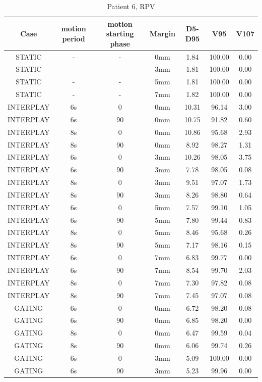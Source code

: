 \documentclass[type=dr, dr=rernat, accentcolor=tud7b,colorbacktitle, bigchapter, openright, twoside, 12pt ]{tudthesis}
\begin{document}
\begin{table}[H]
  \centering
  \caption{Patient 6, RPV}
  \begin{tabular}{|c||c|c|c||c|c|c|}
    \hline\hline
    Case & motion period & motion starting phase & Margin & D5-D95 & V95 & V107\\
    \hline 
STATIC & - & - & 0mm & 1.84 & 100.00 & 0.00 \\
STATIC & - & - & 3mm & 1.81 & 100.00 & 0.00 \\
STATIC & - & - & 5mm & 1.81 & 100.00 & 0.00 \\
STATIC & - & - & 7mm & 1.82 & 100.00 & 0.00 \\
INTERPLAY & 6s & 0 & 0mm & 10.31 & 96.14 & 3.00 \\
INTERPLAY & 6s & 90 & 0mm & 10.75 & 91.82 & 0.60 \\
INTERPLAY & 8s & 0 & 0mm & 10.86 & 95.68 & 2.93 \\
INTERPLAY & 8s & 90 & 0mm & 8.92 & 98.27 & 1.31 \\
INTERPLAY & 6s & 0 & 3mm & 10.26 & 98.05 & 3.75 \\
INTERPLAY & 6s & 90 & 3mm & 7.78 & 98.05 & 0.08 \\
INTERPLAY & 8s & 0 & 3mm & 9.51 & 97.07 & 1.73 \\
INTERPLAY & 8s & 90 & 3mm & 8.26 & 98.80 & 0.64 \\
INTERPLAY & 6s & 0 & 5mm & 7.57 & 99.10 & 1.05 \\
INTERPLAY & 6s & 90 & 5mm & 7.80 & 99.44 & 0.83 \\
INTERPLAY & 8s & 0 & 5mm & 8.46 & 95.68 & 0.26 \\
INTERPLAY & 8s & 90 & 5mm & 7.17 & 98.16 & 0.15 \\
INTERPLAY & 6s & 0 & 7mm & 6.83 & 99.77 & 0.00 \\
INTERPLAY & 6s & 90 & 7mm & 8.54 & 99.70 & 2.03 \\
INTERPLAY & 8s & 0 & 7mm & 7.30 & 97.82 & 0.08 \\
INTERPLAY & 8s & 90 & 7mm & 7.45 & 97.07 & 0.08 \\
GATING & 6s & 0 & 0mm & 6.72 & 98.20 & 0.08 \\
GATING & 6s & 90 & 0mm & 6.85 & 98.20 & 0.00 \\
GATING & 8s & 0 & 0mm & 6.47 & 99.59 & 0.04 \\
GATING & 8s & 90 & 0mm & 6.06 & 99.74 & 0.26 \\
GATING & 6s & 0 & 3mm & 5.09 & 100.00 & 0.00 \\
GATING & 6s & 90 & 3mm & 5.23 & 99.96 & 0.00 \\

\end{tabular}
\end{table}
\end{document}
